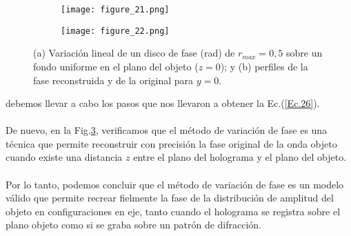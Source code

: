 \documentclass[12pt]{article}
\begin{document}
\begin{figure}[t!]
\centering
\begin{center}
    \begin{subfigure}[b]{0.45\textwidth}
        \texttt{[image: figure\_21.png]}
        \caption{}
        \label{f12a}
    \end{subfigure}
    \hspace{15pt}
    \begin{subfigure}[b]{0.45\textwidth}
        \texttt{[image: figure\_22.png]}
        \caption{}
        \label{f12b}
    \end{subfigure}
    \caption{(a) Variación lineal de un disco de fase (rad) de $r_{max} = 0,5$  sobre un fondo uniforme en el plano del objeto ($z=0$);  y (b) perfiles de la fase reconstruida y  de la original para $y = 0$.}
    \label{figura12}
\end{center}
\end{figure}
debemos llevar a cabo los pasos que nos llevaron a obtener la Ec.(\ref{Ec.26}). \\ \\
De nuevo, en la Fig.\ref{figura12}, verificamos que el método de variación de fase es una técnica que permite reconstruir con precisión la fase original de la onda objeto cuando existe una distancia $z$ entre el plano del holograma y el plano del objeto. \\ \\
Por lo tanto, podemos concluir que el método de variación de fase es un modelo válido que permite recrear fielmente la fase de la distribución de amplitud del objeto en configuraciones en eje, tanto cuando el holograma se registra sobre el plano objeto como si se graba sobre un patrón de difracción. 
\end{document}
